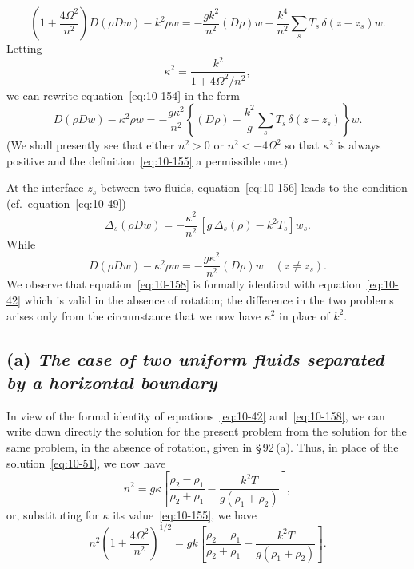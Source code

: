 \begin{equation}
\label{eq:10-154}
\left(1+\frac{4\Omega^2}{n^2}\right)D(\rho Dw) - k^2\rho w = -\frac{gk^2}{n^2}(D\rho)w - \frac{k^4}{n^2}\sum_s T_s\,\delta(z-z_s)w.
\end{equation}
Letting
\begin{equation}
\label{eq:10-155}
\kappa^2 = \frac{k^2}{1+4\Omega^2/n^2},
\end{equation}
we can rewrite equation~\eqref{eq:10-154} in the form
\begin{equation}
\label{eq:10-156}
D(\rho Dw) - \kappa^2\rho w = -\frac{g\kappa^2}{n^2}\left\{(D\rho) - \frac{k^2}{g}\sum_s T_s\,\delta(z-z_s)\right\}w.
\end{equation}
(We shall presently see that either $n^2 > 0$ or $n^2 < -4\Omega^2$ so that $\kappa^2$ is always positive and the definition~\eqref{eq:10-155} a permissible one.)

At the interface $z_s$ between two fluids, equation~\eqref{eq:10-156} leads to the condition (cf.\ equation~\eqref{eq:10-49})
\begin{equation}
\label{eq:10-157}
\Delta_s(\rho Dw) = -\frac{\kappa^2}{n^2}\,[g\,\Delta_s(\rho)-k^2T_s]w_s.
\end{equation}
While
\begin{equation}
\label{eq:10-158}
D(\rho Dw) - \kappa^2\rho w = -\frac{g\kappa^2}{n^2}(D\rho)w \quad (z \neq z_s).
\end{equation}
We observe that equation~\eqref{eq:10-158} is formally identical with equation~\eqref{eq:10-42} which is valid in the absence of rotation; the difference in the two problems arises only from the circumstance that we now have $\kappa^2$ in place of $k^2$.

\subsection*{(a) \textit{The case of two uniform fluids separated by a horizontal boundary}}

In view of the formal identity of equations~\eqref{eq:10-42} and~\eqref{eq:10-158}, we can write down directly the solution for the present problem from the solution for the same problem, in the absence of rotation, given in \S\,92\,(a). Thus, in place of the solution~\eqref{eq:10-51}, we now have
\begin{equation}
\label{eq:10-159}
n^2 = g\kappa\!\left[\frac{\rho_2-\rho_1}{\rho_2+\rho_1}-\frac{k^2T}{g(\rho_1+\rho_2)}\right]\!,
\end{equation}
or, substituting for $\kappa$ its value~\eqref{eq:10-155}, we have
\begin{equation}
\label{eq:10-160}
n^2\!\left(1+\frac{4\Omega^2}{n^2}\right)^{1/2} = gk\!\left[\frac{\rho_2-\rho_1}{\rho_2+\rho_1}-\frac{k^2T}{g(\rho_1+\rho_2)}\right]\!.
\end{equation}

